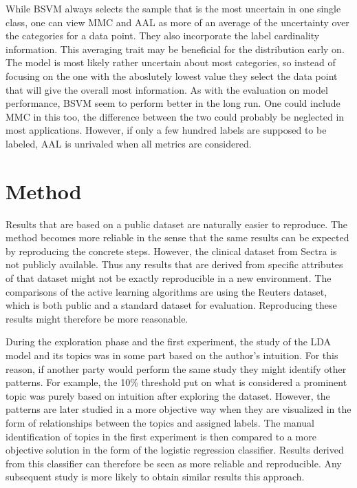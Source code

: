 While BSVM always selects the sample that is the most uncertain in one single class, one can view MMC and AAL as more of an average of the uncertainty over the categories for a data point.
They also incorporate the label cardinality information.
This averaging trait may be beneficial for the distribution early on.
The model is most likely rather uncertain about most categories, so instead of focusing on the one with the aboslutely lowest value they select the data point that will give the overall most information.
As with the evaluation on model performance, BSVM seem to perform better in the long run.
One could include MMC in this too, the difference between the two could probably be neglected in most applications.
However, if only a few hundred labels are supposed to be labeled, AAL is unrivaled when all metrics are considered.



\section{Method}
\label{sec:discussion-method}

Results that are based on a public dataset are naturally easier to reproduce.
The method becomes more reliable in the sense that the same results can be expected by reproducing the concrete steps.
However, the clinical dataset from Sectra is not publicly available.
Thus any results that are derived from specific attributes of that dataset might not be exactly reproducible in a new environment.
The comparisons of the active learning algorithms are using the Reuters dataset, which is both public and a standard dataset for evaluation.
Reproducing these results might therefore be more reasonable.

During the exploration phase and the first experiment, the study of the LDA model and its topics was in some part based on the author's intuition.
For this reason, if another party would perform the same study they might identify other patterns.
For example, the 10\% threshold put on what is considered a prominent topic was purely based on intuition after exploring the dataset.
However, the patterns are later studied in a more objective way when they are visualized in the form of relationships between the topics and assigned labels.
The manual identification of topics in the first experiment is then compared to a more objective solution in the form of the logistic regression classifier.
Results derived from this classifier can therefore be seen as more reliable and reproducible.
Any subsequent study is more likely to obtain similar results this approach.

